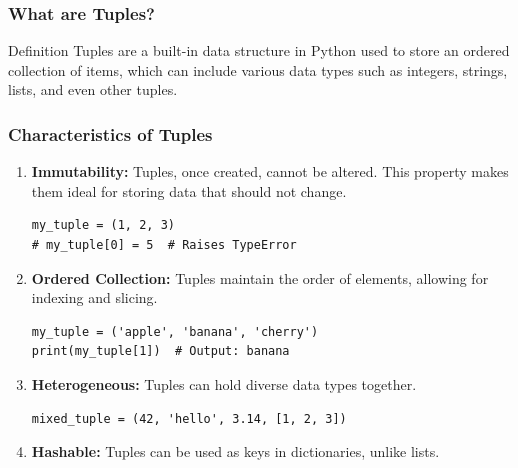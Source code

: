 \documentclass{beamer}
\begin{document}
\begin{frame}
    \frametitle{What are Tuples?}
    \begin{block}{Definition}
        Tuples are a built-in data structure in Python used to store an ordered collection of items, 
        which can include various data types such as integers, strings, lists, and even other tuples.
    \end{block}
\end{frame}

\begin{frame}[fragile]
    \frametitle{Characteristics of Tuples}
    \begin{enumerate}
        \item \textbf{Immutability:} Tuples, once created, cannot be altered. This 
        property makes them ideal for storing data that should not change.
        \begin{lstlisting}
my_tuple = (1, 2, 3)
# my_tuple[0] = 5  # Raises TypeError
        \end{lstlisting}

        \item \textbf{Ordered Collection:} Tuples maintain the order of elements, allowing 
        for indexing and slicing.
        \begin{lstlisting}
my_tuple = ('apple', 'banana', 'cherry')
print(my_tuple[1])  # Output: banana
        \end{lstlisting}

        \item \textbf{Heterogeneous:} Tuples can hold diverse data types together.
        \begin{lstlisting}
mixed_tuple = (42, 'hello', 3.14, [1, 2, 3])
        \end{lstlisting}

        \item \textbf{Hashable:} Tuples can be used as keys in dictionaries, unlike lists.
    \end{enumerate}
\end{frame}
\end{document}
